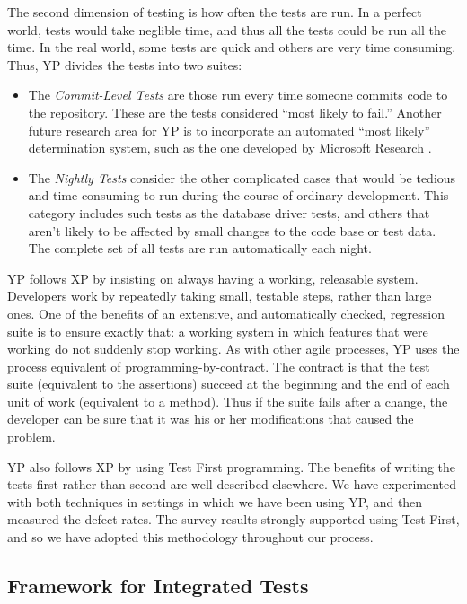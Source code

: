 \documentclass[times, 10pt,twocolumn]{article}
\newcommand{\tight}{\itemsep 0pt}
\begin{document}
The second dimension of testing is how often the tests are run.  In a
perfect world, tests would take neglible time, and thus all the tests could
be run all the time.  In the real world, some tests are quick and others
are very time consuming.  Thus, YP divides the tests into two suites:

\begin{itemize}
\tight

\item The \emph{Commit-Level Tests} are those run every time someone
commits code to the repository. These are the tests considered ``most
likely to fail.''  Another future research area for YP is to incorporate an
automated ``most likely'' determination system, such as the one developed
by Microsoft Research \cite{gates-oopsla-2002}.

\item The \emph{Nightly Tests} consider the other complicated cases that
would be tedious and time consuming to run during the course of ordinary
development.  This category includes such tests as the database driver
tests, and others that aren't likely to be affected by small changes to
the code base or test data.  The complete set of all tests are run
automatically each night.

\end{itemize}

YP follows XP by insisting on always having a working, releasable system.
Developers work by repeatedly taking small, testable steps, rather than
large ones.
One of the benefits of an extensive, and automatically checked, regression
suite is to ensure exactly that: a working system in which features that
were working do not suddenly stop working.
As with other agile processes, YP uses the process equivalent of 
programming-by-contract.  The contract is that the test suite (equivalent
to the assertions) succeed at the beginning and the end of each unit of 
work (equivalent to a method).  Thus if the suite fails after a change,
the developer can be sure that it was his or her modifications that caused
the problem.

YP also follows XP by using Test First programming.  The benefits of
writing the tests first rather than second are well described elsewhere.
We have experimented with both techniques in settings in which we have been
using YP, and then measured the defect rates.  The survey results strongly
supported using Test First, and so we have adopted this methodology
throughout our process.

\subsection{Framework for Integrated Tests}
\end{document}
